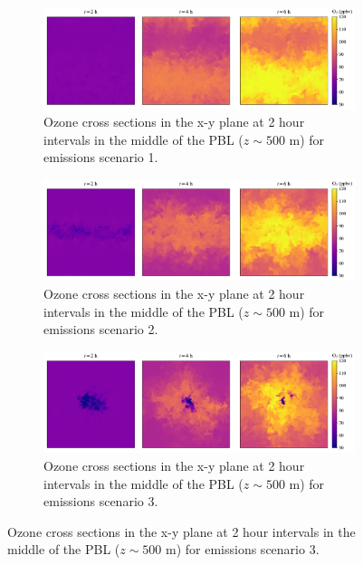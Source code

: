 \begin{figure}[h]
  \centering
  \begin{subfigure}
    \centering
    \includegraphics[width=\textwidth]{figures/chapter4/o3-crosssec-fx1fy0-z25.pdf}
    \caption{Ozone cross sections in the x-y plane at 2 hour intervals in the middle of the PBL ($z\sim500$ \si{m}) for emissions scenario 1.}
    \label{fig:o3-crosssec-s1}
  \end{subfigure}
     \vspace*{5mm} 
  \begin{subfigure}
    \centering
    \includegraphics[width=\textwidth]{figures/chapter4/o3-crosssec-road-10x-z25.pdf}
    \caption{Ozone cross sections in the x-y plane at 2 hour intervals in the middle of the PBL ($z\sim500$ \si{m}) for emissions scenario 2.}
    \label{fig:o3-crosssec-s2}
  \end{subfigure}
   \vspace*{5mm} 
  \begin{subfigure}
    \centering
    \includegraphics[width=\textwidth]{figures/chapter4/o3-crosssec-point-source-1x1-z25.pdf}
    \caption{Ozone cross sections in the x-y plane at 2 hour intervals in the middle of the PBL ($z\sim500$ \si{m}) for emissions scenario 3.}
    \label{fig:o3-crosssec-s3}
  \end{subfigure}
\end{figure}


